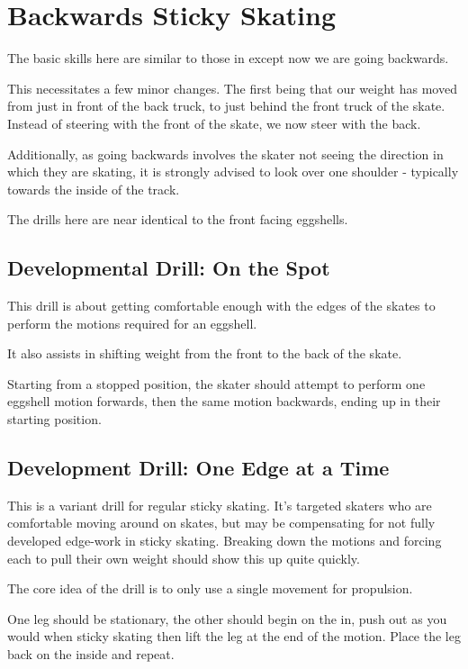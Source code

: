 \section{Backwards Sticky Skating}
\label{sec:sticky/backwards}

The basic skills here are similar to those in  except now we are going backwards. 

This necessitates a few minor changes.
The first being that our weight has moved from just in front of the back truck, to just behind the front truck of the skate. 
Instead of steering with the front of the skate, we now steer with the back.

Additionally, as going backwards involves the skater not seeing the direction in which they are skating, it is strongly advised to look over one shoulder - typically towards the inside of the track.     

The drills here are near identical to the front facing eggshells. 

\subsection*{Developmental Drill: On the Spot}
\label{drill:sticky/backwards/spot}

This drill is about getting comfortable enough with the edges of the skates to perform the motions required for an eggshell.   

It also assists in shifting weight from the front to the back of the skate. 

Starting from a stopped position, the skater should attempt to perform one eggshell motion forwards, then the same motion backwards, ending up in their starting position.  


\subsection*{Development Drill: One Edge at a Time}
\label{drill:sticky/backwards/one_edge}

This is a variant drill for regular sticky skating. 
It's targeted skaters who are comfortable moving around on skates, but may be compensating for not fully developed edge-work in sticky skating.
Breaking down the motions and forcing each to pull their own weight should show this up quite quickly.

The core idea of the drill is to only use a single movement for propulsion.  

One leg should be stationary, the other should begin on the in, push out as you would when sticky skating then lift the leg at the end of the motion.  
Place the leg back on the inside and repeat. 

